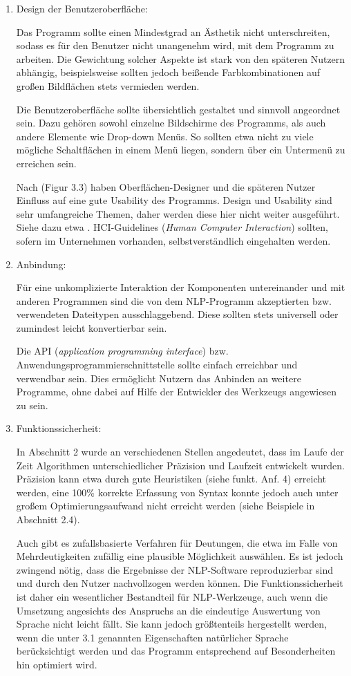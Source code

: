 \documentclass[12pt]{report}
\begin{document}
\begin{enumerate}
\item Design der Benutzeroberfläche:

Das Programm sollte einen Mindestgrad an Ästhetik nicht unterschreiten, sodass es für den Benutzer nicht unangenehm wird, mit dem Programm zu arbeiten. Die Gewichtung solcher Aspekte ist stark von den späteren Nutzern abhängig, beispielsweise sollten jedoch \glqq  beißende\grqq{} Farbkombinationen auf großen Bildflächen stets vermieden werden. 

Die Benutzeroberfläche sollte übersichtlich gestaltet und sinnvoll angeordnet sein. Dazu gehören sowohl einzelne Bildschirme des Programms, als auch andere Elemente wie Drop-down Menüs. So sollten etwa nicht zu viele mögliche Schaltflächen in einem Menü liegen, sondern über ein Untermenü zu erreichen sein. 

Nach \cite{hm13} (Figur 3.3) haben Oberflächen-Designer und die späteren Nutzer Einfluss auf eine gute Usability des Programms. Design und Usability sind sehr umfangreiche Themen, daher werden diese hier nicht weiter ausgeführt. Siehe dazu etwa \cite{shn10}. HCI-Guidelines (\textit{Human Computer Interaction}) sollten, sofern im Unternehmen vorhanden, selbstverständlich eingehalten werden.

\item Anbindung:

Für eine unkomplizierte Interaktion der Komponenten untereinander und mit anderen Programmen sind die von dem NLP-Programm akzeptierten bzw. verwendeten Dateitypen ausschlaggebend. Diese sollten stets universell oder zumindest leicht konvertierbar sein. 

Die API (\textit{application programming interface}) bzw. Anwendungsprogrammierschnittstelle sollte einfach erreichbar und verwendbar sein. Dies ermöglicht Nutzern das Anbinden an weitere Programme, ohne dabei auf Hilfe der Entwickler des Werkzeugs angewiesen zu sein. 
 
\item Funktionssicherheit:

In Abschnitt 2 wurde an verschiedenen Stellen angedeutet, dass im Laufe der Zeit Algorithmen unterschiedlicher Präzision und Laufzeit entwickelt wurden. Präzision kann etwa durch gute Heuristiken (siehe funkt. Anf. 4) erreicht werden, eine 100\% korrekte Erfassung von Syntax konnte jedoch auch unter großem Optimierungsaufwand nicht erreicht werden (siehe Beispiele in Abschnitt 2.4).  

Auch gibt es zufallsbasierte Verfahren für Deutungen, die etwa im Falle von Mehrdeutigkeiten zufällig eine plausible Möglichkeit auswählen. Es ist jedoch zwingend nötig, dass die Ergebnisse der NLP-Software reproduzierbar sind und durch den Nutzer nachvollzogen werden können. Die Funktionssicherheit ist daher ein wesentlicher Bestandteil für NLP-Werkzeuge, auch wenn die Umsetzung angesichts des Anspruchs an die eindeutige Auswertung von Sprache nicht leicht fällt. Sie kann jedoch größtenteils hergestellt werden, wenn die unter 3.1 genannten Eigenschaften natürlicher Sprache berücksichtigt werden und das Programm entsprechend auf Besonderheiten hin optimiert wird.


\end{enumerate}
\end{document}
